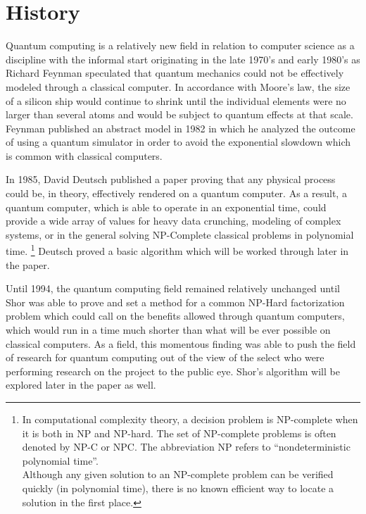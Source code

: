 \documentclass[12pt]{article}
\begin{document}
\newpage

\tableofcontents

\newpage
{}

\section{History}

Quantum computing is a relatively new field in relation to computer science as a discipline with the informal start originating in the late 1970's and early 1980's as Richard Feynman speculated that quantum mechanics could not be effectively modeled through a classical computer. In accordance with Moore's law, the size of a silicon ship would continue to shrink until the individual elements were no larger than several atoms and would be subject to quantum effects at that scale. Feynman published an abstract model in 1982 in which he analyzed the outcome of using a quantum simulator in order to avoid the exponential slowdown which is common with classical computers.\cite{web}\par
In 1985, David Deutsch published a paper proving that any physical process could be, in theory, effectively rendered on a quantum computer. As a result, a quantum computer, which is able to operate in an exponential time, could provide a wide array of values for heavy data crunching, modeling of complex systems, or in the general solving NP-Complete classical problems in polynomial time.
\footnote{In computational complexity theory, a decision problem is NP-complete when it is both in NP and NP-hard. The set of NP-complete problems is often denoted by NP-C or NPC. The abbreviation NP refers to ``nondeterministic polynomial time''.\\Although any given solution to an NP-complete problem can be verified quickly (in polynomial time), there is no known efficient way to locate a solution in the first place.}
Deutsch proved a basic algorithm which will be worked through later in the paper. \par
Until 1994, the quantum computing field remained relatively unchanged until Shor was able to prove and set a method for a common NP-Hard factorization problem which could call on the benefits allowed through quantum computers, which would run in a time much shorter than what will be ever possible on classical computers.\cite{web} As a field, this momentous finding was able to push the field of research for quantum computing out of the view of the select who were performing research on the project to the public eye. Shor's algorithm will be explored later in the paper as well.\par
\end{document}
